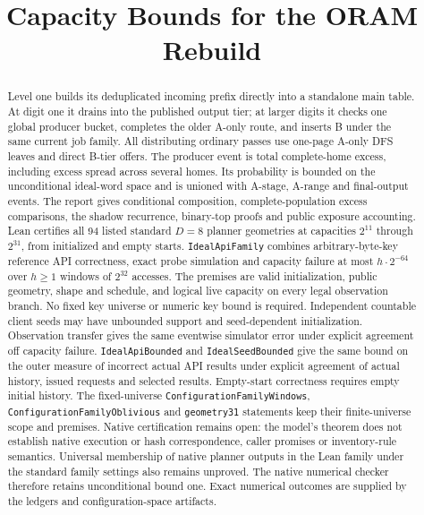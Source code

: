 \documentclass[11pt]{article}
\title{Capacity Bounds for the ORAM Rebuild}
\author{}
\date{}
\theoremstyle{definition}
\theoremstyle{remark}
\begin{document}
\maketitle
\begin{abstract}
Level one builds its deduplicated incoming prefix directly into a standalone
main table. At digit one it drains into the published output tier; at larger
digits it checks one global producer bucket, completes the older A-only route,
and inserts B under the same current job family. All distributing ordinary
passes use one-page A-only DFS leaves and direct B-tier offers.
The producer event is total complete-home excess, including excess spread
across several homes. Its probability is bounded on the unconditional
ideal-word space and is unioned with A-stage, A-range and final-output events.
The report gives conditional composition, complete-population excess
comparisons, the shadow recurrence, binary-top proofs and public exposure
accounting. Lean certifies all 94 listed standard $D=8$ planner
geometries at capacities $2^{11}$ through $2^{31}$, from initialized and empty
starts. \texttt{IdealApiFamily} combines arbitrary-byte-key reference API
correctness, exact probe simulation and capacity failure at most
$h\cdot2^{-64}$ over $h\ge1$ windows of $2^{32}$ accesses. The premises are
valid initialization, public geometry, shape and schedule, and logical live
capacity on every legal observation branch. No fixed key universe or numeric
key bound is required. Independent countable client seeds may have unbounded
support and seed-dependent initialization. Observation transfer gives the same
eventwise simulator error under explicit agreement off capacity failure.
\texttt{IdealApiBounded} and \texttt{IdealSeedBounded} give the same bound
on the outer measure of incorrect actual API results under explicit agreement
of actual history, issued requests and selected results. Empty-start correctness requires
empty initial history. The fixed-universe \texttt{ConfigurationFamilyWindows},
\texttt{ConfigurationFamilyOblivious} and \texttt{geometry31} statements keep
their finite-universe scope and premises.
Native certification remains open: the model's theorem does not establish
native execution or hash correspondence, caller promises or inventory-rule
semantics. Universal membership of native planner outputs in the Lean family
under the standard family settings also remains unproved. The native numerical checker therefore retains
unconditional bound one.
Exact numerical outcomes are supplied by the ledgers and
configuration-space artifacts.
\end{abstract}
\begingroup\small\tableofcontents\endgroup\clearpage
\end{document}
